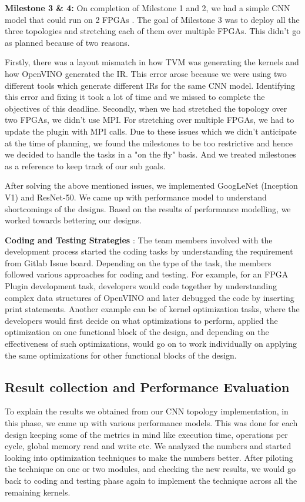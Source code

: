 \textbf{Milestone 3 \& 4:} On completion of Milestone 1 and 2, we had a simple CNN model that could run on 2 FPGAs . The goal of Milestone 3 was to deploy all the three topologies and stretching each of them over multiple FPGAs. This didn't go as planned because of two reasons. 

Firstly, there was a layout mismatch in how TVM was generating the kernels and how OpenVINO generated the IR. This error arose because we were using two different tools which generate different IRs for the same CNN model. Identifying this error and fixing it took a lot of time and we missed to complete the objectives of this deadline. Secondly, when we had stretched the topology over two FPGAs, we didn't use MPI. For stretching over multiple FPGAs, we had to update the plugin with MPI calls. Due to these issues which we didn't anticipate at the time of planning, we found the milestones to be too restrictive and hence we decided to handle the tasks in a "on the fly" basis. And we treated milestones as a reference to keep track of our sub goals. 

After solving the above mentioned issues, we implemented GoogLeNet (Inception V1) and ResNet-50. We came up with performance model to understand shortcomings of the designs. Based on the results of performance modelling, we worked towards bettering our designs.

\textbf{Coding and Testing Strategies} : The team members involved with the development process started the coding tasks by understanding the requirement from Gitlab Issue board. Depending on the type of the task, the members followed various approaches for coding and testing. For example, for an FPGA Plugin development task, developers would code together by understanding complex data structures of OpenVINO and later debugged the code by inserting print statements. Another example can be of kernel optimization tasks, where the developers would first decide on what optimizations to perform, applied the optimization on one functional block of the design, and depending on the effectiveness of such optimizations, would go on to work individually on applying the same optimizations for other functional blocks of the design. 


\subsection{Result collection and Performance Evaluation}
To explain the results we obtained from our CNN topology implementation, in this phase, we came up with various performance models. This was done for each design keeping some of the metrics in mind like execution time, operations per cycle, global memory read and write etc. We analyzed the numbers and started looking into optimization techniques to make the numbers better. After piloting the technique on one or two modules, and checking the new results, we would go back to coding and testing phase again to implement the technique across all the remaining kernels. 

